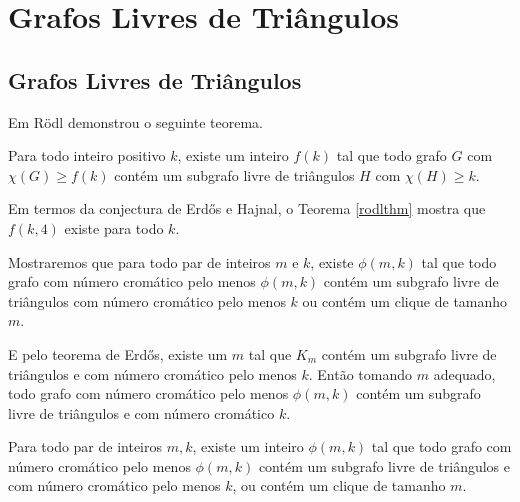 \chapter{Grafos Livres de Triângulos}
\label{cap:livretriangulos}

\section{Grafos Livres de Triângulos}

Em \cite{rodl1977chromatic} R\"{o}dl demonstrou o seguinte teorema.

\begin{teorema}\label{rodlthm}
Para todo inteiro positivo $k$, existe um inteiro $f(k)$ tal que todo grafo $G$ com $\chi(G) \geq f(k)$ contém um subgrafo livre de triângulos $H$ com $\chi(H) \geq k$.
\end{teorema}

Em termos da conjectura de Erd\H{o}s e Hajnal, o Teorema \ref{rodlthm} mostra que $f(k,4)$ existe para todo $k$.

Mostraremos que para todo par de inteiros $m$ e $k$, existe $\phi(m,k)$ tal que todo grafo com número cromático pelo menos $\phi(m,k)$ contém um subgrafo livre de triângulos com número cromático pelo menos $k$ ou contém um clique de tamanho $m$. 

E pelo teorema de Erd\H{o}s, existe um $m$ tal que $K_m$ contém um subgrafo livre de triângulos e com número cromático pelo menos $k$. Então tomando $m$ adequado, todo grafo com número cromático pelo menos $\phi(m,k)$ contém um subgrafo livre de triângulos e com número cromático $k$.

\begin{lema}\label{livretriangulolema1}
Para todo par de inteiros $m,k$, existe um inteiro $\phi(m,k)$ tal que todo grafo com número cromático pelo menos $\phi(m,k)$ contém um subgrafo livre de triângulos e com número cromático pelo menos $k$, ou contém um clique de tamanho $m$.
\end{lema}

